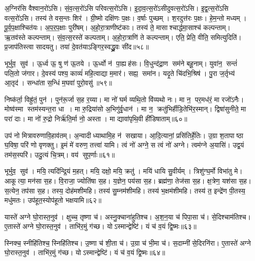 अ॒ग्निर॑सि वैश्वान॒रो॑ऽसि। सं॒व॒त्स॒रो॑ऽसि परिवत्स॒रो॑ऽसि। इ॒दा॒व॒त्स॒रो॑ऽसीदुवत्स॒रो॑ऽसि। इ॒द्व॒त्स॒रो॑ऽसि वत्स॒रो॑ऽसि। तस्य॑ ते वस॒न्तः  शिर॑। ग्री॒ष्मो दक्षि॑णः प॒क्षः। व॒र्\mbox{}षाः पुच्छम्। श॒रदुत्त॑रः प॒क्षः। हे॒म॒न्तो मध्यम्। पू॒र्व॒प॒क्षाश्चित॑यः। अ॒प॒र॒प॒क्षाः पुरी॑षम्। अ॒हो॒रा॒त्राणीष्ट॑काः। तस्य॑ ते॒ मासाश्चार्द्धमा॒साश्च॑ कल्पन्ताम्। ऋ॒तव॑स्ते कल्पन्ताम्। सं॒व॒त्स॒रस्ते॑ कल्पताम्। अ॒हो॒रा॒त्राणि॑ ते कल्पन्ताम्। एति॒ प्रेति॒ वीति॒ समित्युदिति॑। प्र॒जाप॑तिस्त्वा सादयतु। तया॑ दे॒वत॑याऽङ्गिर॒स्वद्ध्रु॒वः सी॑द॥५८॥
\anuvakamend[चित॑यो॒ नव॑ च]


भूर्भुव॒ सुव॑। ऊ॒र्ध्व ऊ॒ षु ण॑ ऊ॒तये। ऊ॒र्ध्वो न॑ पा॒ह्यह॑सः। वि॒धुन्द॑द्रा॒ण सम॑ने बहू॒नाम्। युवा॑न॒ सन्तं॑ पलि॒तो ज॑गार। दे॒वस्य॑ पश्य॒ काव्यं॑ महि॒त्वाद्या म॒मार॑। सह्य॒ समा॑न। यदृ॒ते चि॑दभि॒श्रिष॑। पु॒रा ज॒र्तृभ्य॑ आ॒तृद॑। सन्धा॑ता स॒न्धिं म॒घवा॑ पुरो॒वसु॑॥५९॥

निष्क॑र्ता॒ विह्रु॑तं॒ पुन॑। पुन॑रू॒र्जा स॒ह र॒य्या। मा नो॑ घर्म व्यथि॒तो वि॑व्यथो नः। मा न॒ पर॒मध॑रं॒ मा रजो॑ऽनैः। मोष्व॑स्मा स्तम॑स्यन्त॒रा धा। मा रु॒द्रिया॑सो अ॒भिगु॑र्वृ॒धान॑। मा न॒ क्रतु॑भिर्\mbox{}हीडि॒तेभि॑र॒स्मान्। द्विषा॑सुनीते॒ मा परा॑ दाः। मा नो॑ रु॒द्रो निर्\mbox{}ऋ॑ति॒र्मा नो॒ अस्ता। मा द्यावा॑पृथि॒वी ही॑डिषाताम्॥६०॥

उप॑ नो मित्रावरुणावि॒हाव॑तम्। अ॒न्वादीध्याथामि॒ह न॑ सखाया। आ॒दि॒त्यानां॒ प्रसि॑तिर्\mbox{}हे॒तिः। उ॒ग्रा श॒तापाष्ठा घ॒विषा॒ परि॑ णो वृणक्तु। इ॒मं मे॑ वरुण॒ तत्त्वा॑ यामि। त्वं नो॑ अग्ने॒ स त्वं नो॑ अग्ने। त्वम॑ग्ने अ॒यासि॑। उद्व॒यं तम॑स॒स्परि॑। उदु॒त्यं चि॒त्रम्। वय॑ सुप॒र्णाः॥६१॥
\anuvakamend[पु॒रो॒वसु॑र्\mbox{}हीडिषाता सुप॒र्णाः]


भूर्भुव॒ सुव॑। मयि॒ त्यदि॑न्द्रि॒यं म॒हत्। मयि॒ दक्षो॒ मयि॒ क्रतु॑। मयि॑ धायि सु॒वीर्यम्। त्रिशु॑ग्घ॒र्मो विभा॑तु मे। आकूत्या॒ मन॑सा स॒ह। वि॒राजा॒ ज्योति॑षा स॒ह। य॒ज्ञेन॒ पय॑सा स॒ह। ब्रह्म॑णा॒ तेज॑सा स॒ह। क्ष॒त्रेण॒ यश॑सा स॒ह। स॒त्येन॒ तप॑सा स॒ह। तस्य॒ दोह॑मशीमहि। तस्य॑ सु॒म्नम॑शीमहि। तस्य॑ भ॒क्षम॑शीमहि। तस्य॑ त॒ इन्द्रे॑ण पी॒तस्य॒ मधु॑मतः। उप॑हूत॒स्योप॑हूतो भक्षयामि॥६२॥
\anuvakamend[यश॑सा स॒ह षट्च॑]

यास्ते॑ अग्ने घो॒रास्त॒नुव॑। क्षुच्च॒ तृष्णा च॑। अस्नु॒क्चाना॑हुतिश्च। अ॒श॒न॒या च॑ पिपा॒सा च॑। से॒दिश्चाम॑तिश्च। ए॒तास्ते॑ अग्ने घो॒रास्त॒नुव॑। ताभि॑र॒मुं ग॑च्छ। योऽस्मान्द्वेष्टि॑। यं च॑ व॒यं द्वि॒ष्मः॥६३॥
\anuvakamend

स्निक्च॒ स्नीहि॑तिश्च॒ स्निहि॑तिश्च। उ॒ष्णा च॑ शी॒ता च॑। उ॒ग्रा च॑ भी॒मा च॑। स॒दाम्नी॑ से॒दिरनि॑रा। ए॒तास्ते॑ अग्ने घो॒रास्त॒नुव॑। ताभि॑र॒मुं ग॑च्छ। योऽस्मान्द्वेष्टि॑। यं च॑ व॒यं द्वि॒ष्मः॥६४॥
\anuvakamend

